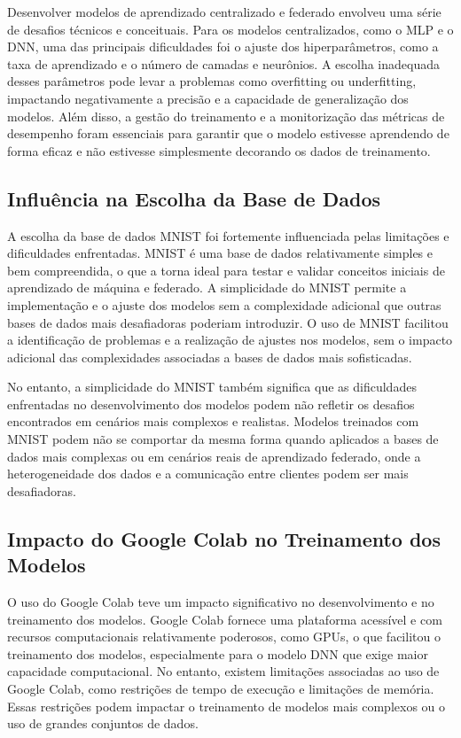 Desenvolver modelos de aprendizado centralizado e federado envolveu uma série de desafios técnicos e conceituais. Para os modelos centralizados, como o MLP e o DNN, uma das principais dificuldades foi o ajuste dos hiperparâmetros, como a taxa de aprendizado e o número de camadas e neurônios. A escolha inadequada desses parâmetros pode levar a problemas como overfitting ou underfitting, impactando negativamente a precisão e a capacidade de generalização dos modelos. Além disso, a gestão do treinamento e a monitorização das métricas de desempenho foram essenciais para garantir que o modelo estivesse aprendendo de forma eficaz e não estivesse simplesmente decorando os dados de treinamento.

\subsection{Influência na Escolha da Base de Dados}

A escolha da base de dados MNIST foi fortemente influenciada pelas limitações e dificuldades enfrentadas. MNIST é uma base de dados relativamente simples e bem compreendida, o que a torna ideal para testar e validar conceitos iniciais de aprendizado de máquina e federado. A simplicidade do MNIST permite a implementação e o ajuste dos modelos sem a complexidade adicional que outras bases de dados mais desafiadoras poderiam introduzir. O uso de MNIST facilitou a identificação de problemas e a realização de ajustes nos modelos, sem o impacto adicional das complexidades associadas a bases de dados mais sofisticadas.

No entanto, a simplicidade do MNIST também significa que as dificuldades enfrentadas no desenvolvimento dos modelos podem não refletir os desafios encontrados em cenários mais complexos e realistas. Modelos treinados com MNIST podem não se comportar da mesma forma quando aplicados a bases de dados mais complexas ou em cenários reais de aprendizado federado, onde a heterogeneidade dos dados e a comunicação entre clientes podem ser mais desafiadoras.

\subsection{Impacto do Google Colab no Treinamento dos Modelos}

O uso do Google Colab teve um impacto significativo no desenvolvimento e no treinamento dos modelos. Google Colab fornece uma plataforma acessível e com recursos computacionais relativamente poderosos, como GPUs, o que facilitou o treinamento dos modelos, especialmente para o modelo DNN que exige maior capacidade computacional. No entanto, existem limitações associadas ao uso de Google Colab, como restrições de tempo de execução e limitações de memória. Essas restrições podem impactar o treinamento de modelos mais complexos ou o uso de grandes conjuntos de dados.

